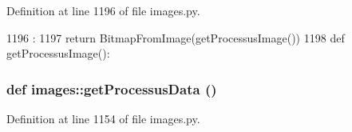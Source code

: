 Definition at line 1196 of file images.py.


\begin{DoxyCode}
1196                         :
1197     return BitmapFromImage(getProcessusImage())
1198 
def getProcessusImage():
\end{DoxyCode}
\hypertarget{namespaceimages_af0777d8bd35515dc100a0d22f6f3ac91}{
\subsubsection[{getProcessusData}]{\setlength{\rightskip}{0pt plus 5cm}def images::getProcessusData ()}}
\label{namespaceimages_af0777d8bd35515dc100a0d22f6f3ac91}


Definition at line 1154 of file images.py.


